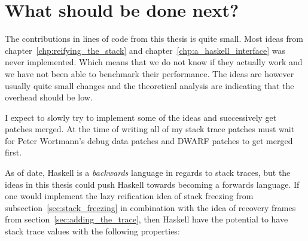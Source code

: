 \section{What should be done next?}

The contributions in lines of code from this thesis is quite small.
Most ideas from chapter~\ref{chp:reifying_the_stack} and chapter~\ref{chp:a_haskell_interface} was never implemented. Which means that we
do not know if they actually work and we have not been able to benchmark
their performance. The ideas are however usually quite small changes and
the theoretical analysis are indicating that the overhead should be low.

I expect to slowly try to implement some of the ideas and successively
get patches merged. At the time of writing all of my stack trace patches
must wait for Peter Wortmann's debug data patches and DWARF patches to
get merged first.

As of date, Haskell is a \emph{backwards} language in regards to stack
traces, but the ideas in this thesis could push Haskell towards becoming
a forwards language. If one would implement the lazy reification
idea of stack freezing from subsection~\ref{sec:stack_freezing}
in combination with the idea of recovery frames from section~\ref{sec:adding_the_trace}, then Haskell have the potential to have
stack trace values with the following properties:

